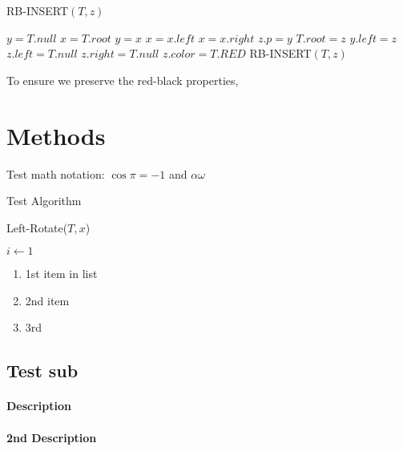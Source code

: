 \documentclass[10pt, 
a4paper, 
oneside, 
headinclude, footinclude, 
BCOR5mm]
{scrartcl}
\begin{document}
\begin{algorithm}
    \caption{RB-INSERT$(T,z)$}
    \BlankLine

    $y=T.null$\;
    $x=T.root$\;
        {$y=x$\;        
            {$x=x.left$\;}
        {$x=x.right$\;}}
    $z.p=y$\;
        {$T.root=z$\;}
        {$y.left=z$\;}
    $z.left=T.null$\;
    $z.right=T.null$\;
    $z.color=T.RED$\;
    RB-INSERT$(T,z)$\;
    
\end{algorithm}

To ensure we preserve the {\color{red}red}-black properties, 

\newpage





\section{Methods}

Test math notation: $\cos\pi=-1$ and $\alpha\omega$

Test Algorithm
\IncMargin{1em}
\begin{algorithm}
    \caption{Left-Rotate($T,x$)}
    \BlankLine

    $i \gets 1$\;

\end{algorithm}\DecMargin{1em}


\begin{enumerate}
    \item 1st item in list
    \item 2nd item 
    \item 3rd
\end{enumerate}

\subsection{Test sub}

\paragraph{Description}
\paragraph{2nd Description}
\end{document}
